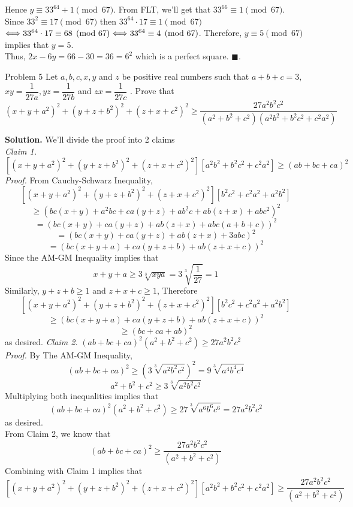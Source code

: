 \documentclass[12pt]{article}
\begin{document}
Hence $y \equiv 33^{64}+1 \pmod {67}$. From FLT, we'll get that $33^{66} \equiv 1 \pmod{67}$.\\
Since $33^2 \equiv 17 \pmod{67}$ then $33^{64} \cdot 17 \equiv 1 \pmod {67}$ $\Longleftrightarrow 33^{64} \cdot 17 \equiv 68 \pmod {67}\\ \Longleftrightarrow 33^{64} \equiv 4 \pmod {67}$. Therefore, $y \equiv 5 \pmod{67}$ implies that $y=5$.\\
Thus, $2x-6y = 66  - 30 = 36 = 6^2$ which is a perfect square. \null\hfill $\blacksquare$.
\newpage
\begin{mybox}{Problem 5}
Let  $a,b,c,x,y$ and $z$ be positive real numbers such that $a+b+c=3 ,$ \\ $ xy = \dfrac{1}{27a} ,yz = \dfrac{1}{27b} $ and $zx = \dfrac{1}{27c}$ . Prove that 
$$ (x+y+a^2)^2 + (y+z+b^2)^2 + (z+x+c^2)^2 \geq \dfrac{27a^2b^2c^2}{(a^2+b^2+c^2)(a^2b^2+b^2c^2+c^2a^2)}$$ 
\end{mybox}
\textbf{Solution.} We'll divide the proof into 2 claims\\
\emph{Claim 1.} $\left[(x+y+a^2)^2 + (y+z+b^2)^2 + (z+x+c^2)^2\right]\left[{a^2}{b^2}+{b^2}{c^2}+{c^2}{a^2}\right] \geq (ab+bc+ca)^2$\\
\emph{Proof.} From Cauchy-Schwarz Inequality,
$$\left[(x+y+a^2)^2 + (y+z+b^2)^2 + (z+x+c^2)^2\right]\left[{b^2}{c^2}+{c^2}{a^2}+{a^2}{b^2}\right]$$
$$\geq (bc(x+y)+a^2bc+ca(y+z)+ab^2c+ab(z+x)+abc^2)^2 $$
$$= (bc(x+y)+ca(y+z)+ab(z+x)+abc(a+b+c))^2 $$
$$= (bc(x+y)+ca(y+z)+ab(z+x)+3abc)^2 $$
$$= (bc(x+y+a)+ca(y+z+b)+ab(z+x+c))^2$$
Since the AM-GM Inequality implies that 
$$x+y+a \geq3 \displaystyle \sqrt[3]{xya} = 3\sqrt[3]{\dfrac{1}{27}} = 1 $$
Similarly, $y+z+b \geq 1$ and $z+x+c \geq 1$, Therefore
$$\left[(x+y+a^2)^2 + (y+z+b^2)^2 + (z+x+c^2)^2\right]\left[{b^2}{c^2}+{c^2}{a^2}+{a^2}{b^2}\right]$$
$$\geq (bc(x+y+a)+ca(y+z+b)+ab(z+x+c))^2$$
$$\geq (bc+ca+ab)^2$$
as desired.
\newpage
\emph{Claim 2.} $(ab+bc+ca)^2(a^2+b^2+c^2) \geq 27a^2b^2c^2$
\\ \emph{Proof.} By The AM-GM Inequality,
$$(ab+bc+ca)^2 \geq (3\sqrt[3]{a^2b^2c^2})^2 = 9\sqrt[3]{a^4b^4c^4} $$
$$a^2+b^2+c^2 \geq 3\sqrt[3]{a^2b^2c^2}$$
Multiplying both inequalities implies that $$(ab+bc+ca)^2(a^2+b^2+c^2) \geq 27\sqrt[3]{a^6b^6c^6} = 27a^2b^2c^2$$
as desired.\\
From Claim 2, we know that $$(ab+bc+ca)^2 \geq \dfrac{27a^2b^2c^2}{(a^2+b^2+c^2)}$$
Combining with Claim 1 implies that 
$$\left[(x+y+a^2)^2 + (y+z+b^2)^2 + (z+x+c^2)^2\right]\left[{a^2}{b^2}+{b^2}{c^2}+{c^2}{a^2}\right] \geq \dfrac{27a^2b^2c^2}
{(a^2+b^2+c^2)}$$
\end{document}
